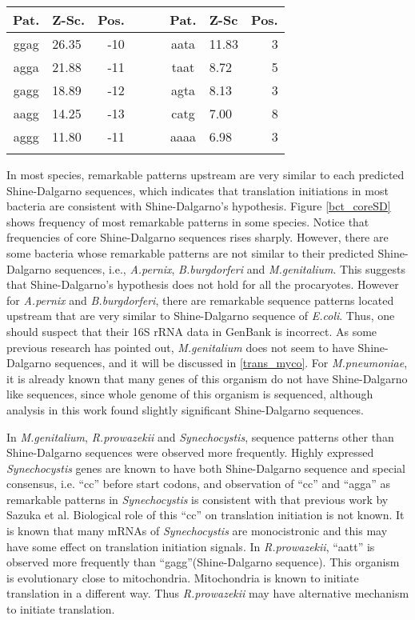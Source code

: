 \noindent
\begin{center}
\begin{tabular}{clrcclr}
Pat. & Z-Sc. & Pos. & \verb+   + & Pat. & Z-Sc & Pos. \\
\hline
ggag & 26.35 & -10 &  & aata & 11.83 & 3 \\
agga & 21.88 & -11 &  & taat & 8.72 & 5 \\
gagg & 18.89 & -12 &  & agta & 8.13 & 3 \\
aagg & 14.25 & -13 &  & catg & 7.00 & 8 \\
aggg & 11.80 & -11 &  & aaaa & 6.98 & 3 \\
    &     \\
\end{tabular}
\end{center}

\vspace{1em}

In most species, remarkable patterns upstream are very similar to each
predicted Shine-Dalgarno sequences, which indicates that translation
initiations in most bacteria are consistent with Shine-Dalgarno's
hypothesis. Figure \ref{bct_coreSD} shows frequency of most remarkable
patterns in some species. Notice that frequencies of core Shine-Dalgarno
sequences rises sharply. However, there are some bacteria whose
remarkable patterns are not similar to their predicted Shine-Dalgarno
sequences, i.e., {\it A.pernix}, {\it B.burgdorferi} and {\it
M.genitalium}. This suggests that Shine-Dalgarno's hypothesis does not
hold for all the procaryotes. However for {\it A.pernix} and {\it
B.burgdorferi}, there are remarkable sequence patterns located upstream
that are very similar to Shine-Dalgarno sequence of {\it E.coli}. Thus,
one should suspect that their 16S rRNA data in GenBank is incorrect. As
some previous research has pointed out\cite{myco_taa,label509}, {\it
M.genitalium} does not seem to have Shine-Dalgarno sequences, and it
will be discussed in \ref{trans_myco}. For {\it M.pneumoniae}, it is
already known that many genes of this organism do not have
Shine-Dalgarno like sequences, since whole genome of this organism is
sequenced\cite{label503}, although analysis in this work found slightly
significant Shine-Dalgarno sequences.

In {\it M.genitalium}, {\it R.prowazekii} and {\it Synechocystis},
sequence patterns other than Shine-Dalgarno sequences were observed
more frequently.  Highly expressed {\it Synechocystis} genes are known
to have both Shine-Dalgarno sequence and special consensus,
i.e. ``cc'' before start codons, and observation of ``cc'' and
``agga'' as remarkable patterns in {\it Synechocystis} is consistent
with that previous work by Sazuka et al\cite{lsaz1}. Biological role
of this ``cc'' on translation initiation is not known. It is known
that many mRNAs of {\it Synechocystis} are monocistronic and this may
have some effect on translation initiation signals.  In {\it
R.prowazekii}, ``aatt'' is observed more frequently than
``gagg''(Shine-Dalgarno sequence). This organism is evolutionary close
to mitochondria\cite{label7009}. Mitochondria is known to initiate
translation in a different way. Thus {\it R.prowazekii} may have
alternative mechanism to initiate translation.

